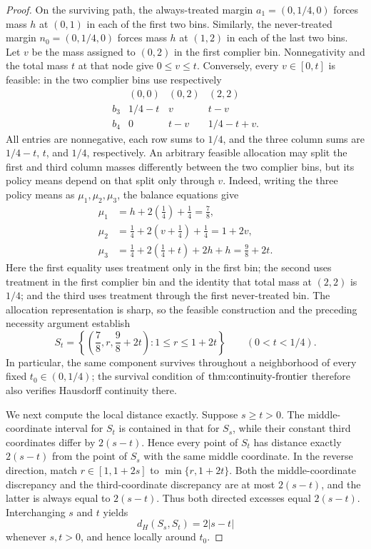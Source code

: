 \documentclass{article}
\begin{document}
\begin{proof}
On the surviving path, the always-treated margin \(a_1=(0,1/4,0)\) forces mass \(h\) at \((0,1)\) in each of the first two bins.  Similarly, the never-treated margin \(n_0=(0,1/4,0)\) forces mass \(h\) at \((1,2)\) in each of the last two bins.  Let \(v\) be the mass assigned to \((0,2)\) in the first complier bin.  Nonnegativity and the total mass \(t\) at that node give \(0\le v\le t\).  Conversely, every \(v\in[0,t]\) is feasible: in the two complier bins use respectively
\[
\begin{array}{c|ccc}
 & (0,0)&(0,2)&(2,2)\\ \hline
 b_3&1/4-t&v&t-v\\
 b_4&0&t-v&1/4-t+v.
\end{array}
\]
All entries are nonnegative, each row sums to \(1/4\), and the three column sums are \(1/4-t\), \(t\), and \(1/4\), respectively.  An arbitrary feasible allocation may split the first and third column masses differently between the two complier bins, but its policy means depend on that split only through \(v\).  Indeed, writing the three policy means as \(\mu_1,\mu_2,\mu_3\), the balance equations give
\[
\begin{aligned}
\mu_1
 &=h+2\left(\frac14\right)+\frac14
 =\frac78,\\
\mu_2
 &=\frac14+2\left(v+\frac14\right)+\frac14
 =1+2v,\\
\mu_3
 &=\frac14+2\left(\frac14+t\right)+2h+h
 =\frac98+2t.
\end{aligned}
\]
Here the first equality uses treatment only in the first bin; the second uses treatment in the first complier bin and the identity that total mass at \((2,2)\) is \(1/4\); and the third uses treatment through the first never-treated bin.  The allocation representation is sharp, so the feasible construction and the preceding necessity argument establish
\[
S_t=\left\{\left(\frac78,r,\frac98+2t\right):1\le r\le1+2t\right\}
\qquad (0<t<1/4).
\tag{1}
\]
In particular, the same component survives throughout a neighborhood of every fixed \(t_0\in(0,1/4)\); the survival condition of \(\textnormal{thm:continuity-frontier}\) therefore also verifies Hausdorff continuity there.

We next compute the local distance exactly.  Suppose \(s\ge t>0\).  The middle-coordinate interval for \(S_t\) is contained in that for \(S_s\), while their constant third coordinates differ by \(2(s-t)\).  Hence every point of \(S_t\) has distance exactly \(2(s-t)\) from the point of \(S_s\) with the same middle coordinate.  In the reverse direction, match \(r\in[1,1+2s]\) to \(\min\{r,1+2t\}\).  Both the middle-coordinate discrepancy and the third-coordinate discrepancy are at most \(2(s-t)\), and the latter is always equal to \(2(s-t)\).  Thus both directed excesses equal \(2(s-t)\).  Interchanging \(s\) and \(t\) yields
\[
d_H(S_s,S_t)=2|s-t|
\tag{2}
\]
whenever \(s,t>0\), and hence locally around \(t_0\).


\end{proof}
\end{document}
